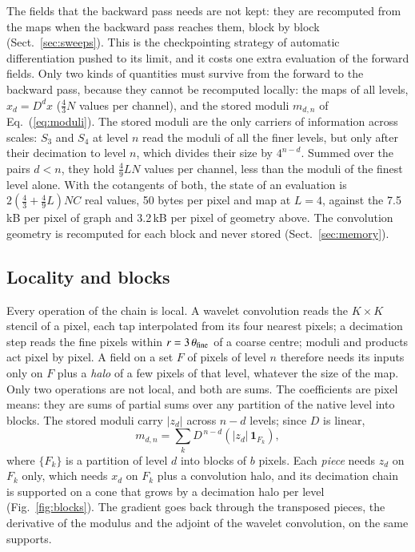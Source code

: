\documentclass{aa}
\begin{document}
The fields that the backward pass needs are not kept: they are recomputed from the maps when the backward pass reaches them, block by block (Sect.~\ref{sec:sweeps}). This is the checkpointing strategy of automatic differentiation pushed to its limit, and it costs one extra evaluation of the forward fields. Only two kinds of quantities must survive from the forward to the backward pass, because they cannot be recomputed locally: the maps of all levels, $x_d=D^dx$ ($\frac{4}{3}N$ values per channel), and the stored moduli $m_{d,n}$ of Eq.~(\ref{eq:moduli}). The stored moduli are the only carriers of information across scales: $S_3$ and $S_4$ at level $n$ read the moduli of all the finer levels, but only after their decimation to level $n$, which divides their size by $4^{n-d}$. Summed over the pairs $d<n$, they hold $\frac{4}{9}LN$ values per channel, less than the moduli of the finest level alone. With the cotangents of both, the state of an evaluation is $2(\frac{4}{3}+\frac{4}{9}L)NC$ real values, 50 bytes per pixel and map at $L=4$, against the 7.5\,kB per pixel of graph and 3.2\,kB per pixel of geometry above. The convolution geometry is recomputed for each block and never stored (Sect.~\ref{sec:memory}).

\subsection{Locality and blocks}
\label{sec:blocks}

Every operation of the chain is local. A wavelet convolution reads the $K\times K$ stencil of a pixel, each tap interpolated from its four nearest pixels; a decimation step reads the fine pixels within $r=3\,\theta_{\rm fine}$ of a coarse centre; moduli and products act pixel by pixel. A field on a set $F$ of pixels of level $n$ therefore needs its inputs only on $F$ plus a \emph{halo} of a few pixels of that level, whatever the size of the map. Only two operations are not local, and both are sums. The coefficients are pixel means: they are sums of partial sums over any partition of the native level into blocks. The stored moduli carry $|z_d|$ across $n-d$ levels; since $D$ is linear,
\begin{equation}
m_{d,n} = \sum_k D^{\,n-d}\left(|z_d|\,\mathbf{1}_{F_k}\right),
\label{eq:pieces}
\end{equation}
where $\{F_k\}$ is a partition of level $d$ into blocks of $b$ pixels. Each \emph{piece} needs $z_d$ on $F_k$ only, which needs $x_d$ on $F_k$ plus a convolution halo, and its decimation chain is supported on a cone that grows by a decimation halo per level (Fig.~\ref{fig:blocks}). The gradient goes back through the transposed pieces, the derivative of the modulus and the adjoint of the wavelet convolution, on the same supports.
\end{document}

